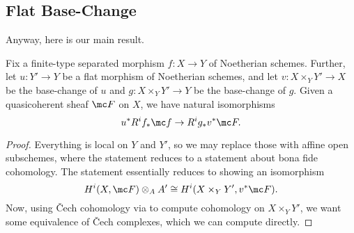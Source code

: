 \documentclass[../notes.tex]{subfiles}
\begin{document}
\subsection{Flat Base-Change}
Anyway, here is our main result.
\begin{theorem}
	Fix a finite-type separated morphism $f\colon X\to Y$ of Noetherian schemes. Further, let $u\colon Y'\to Y$ be a flat morphism of Noetherian schemes, and let $v\colon X\times_YY'\to X$ be the base-change of $u$ and $g\colon X\times_YY'\to Y$ be the base-change of $g$. Given a quasicoherent sheaf $\mc F$ on $X$, we have natural isomorphisms
	\[u^*R^if_*\mc f\to R^ig_*v^*\mc F.\]
\end{theorem}
\begin{proof}
	Everything is local on $Y$ and $Y'$, so we may replace those with affine open subschemes, where the statement reduces to a statement about bona fide cohomology. The statement essentially reduces to showing an isomorphism
	\[H^i(X,\mc F)\otimes_AA'\cong H^i(X\times_YY',v^*\mc F).\]
	Now, using \v Cech cohomology via to compute cohomology on $X\times_YY'$, we want some equivalence of \v Cech complexes, which we can compute directly.
\end{proof}
\end{document}
